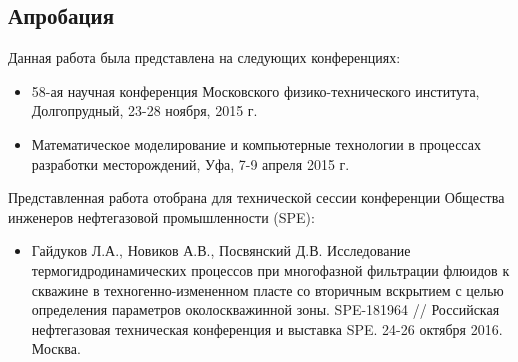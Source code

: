 \subsection*{Апробация}
	Данная работа была представлена на следующих конференциях:
\begin{itemize}
	\item 58-ая научная конференция Московского физико-технического института, Долгопрудный, 23-28 ноября,  2015 г.
	\item Математическое моделирование и компьютерные технологии в процессах разработки месторождений, Уфа, 7-9 апреля 2015 г.
\end{itemize}

	Представленная работа отобрана для технической сессии конференции Общества инженеров нефтегазовой промышленности (SPE):
\begin{itemize}
	\item Гайдуков Л.А., Новиков А.В., Посвянский Д.В. Исследование термогидродинамических процессов при многофазной фильтрации флюидов к скважине в техногенно-измененном пласте со вторичным вскрытием с целью определения параметров околоскважинной зоны. SPE-181964 // Российская нефтегазовая техническая конференция и выставка SPE. 24-26 октября 2016. Москва.
\end{itemize}
	
